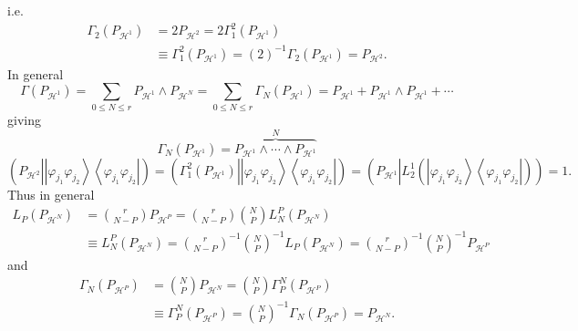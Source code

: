 \documentclass[aps,preprint]{revtex4}%
\begin{document}
i.e.%
\begin{align}
\Gamma_{2}\left(  P_{\mathcal{H}^{1}}\right)   &  =2P_{\mathcal{H}^{2}%
}=2\Gamma_{1}^{2}\left(  P_{\mathcal{H}^{1}}\right)  \nonumber\\
&  \equiv\Gamma_{1}^{2}\left(  P_{\mathcal{H}^{1}}\right)  =\left(  2\right)
^{-1}\Gamma_{2}\left(  P_{\mathcal{H}^{1}}\right)  =P_{\mathcal{H}^{2}}.
\end{align}
In general%
\begin{equation}
\Gamma\left(  P_{\mathcal{H}^{1}}\right)  =\sum_{0\leq N\leq r}P_{\mathcal{H}%
^{1}}\wedge P_{\mathcal{H}^{N}}=\sum_{0\leq N\leq r}\Gamma_{N}\left(
P_{\mathcal{H}^{1}}\right)  =P_{\mathcal{H}^{1}}+P_{\mathcal{H}^{1}}\wedge
P_{\mathcal{H}^{1}}+\cdots
\end{equation}
giving
\begin{equation}
\Gamma_{N}\left(  P_{\mathcal{H}^{1}}\right)
=\overset{N}{\overbrace{P_{\mathcal{H}^{1}}\wedge\cdots\wedge P_{\mathcal{H}%
^{1}}}}%
\end{equation}%
\begin{equation}
\left(  P_{\mathcal{H}^{2}}\left\vert \left\vert \varphi_{j_{1}}\varphi
_{j_{2}}\right\rangle \left\langle \varphi_{j_{1}}\varphi_{j_{2}}\right\vert
\right.  \right)  =\left(  \Gamma_{1}^{2}\left(  P_{\mathcal{H}^{1}}\right)
\left\vert \left\vert \varphi_{j_{1}}\varphi_{j_{2}}\right\rangle \left\langle
\varphi_{j_{1}}\varphi_{j_{2}}\right\vert \right.  \right)  =\left(
P_{\mathcal{H}^{1}}\left\vert L_{2}^{1}\left(  \left\vert \varphi_{j_{1}%
}\varphi_{j_{2}}\right\rangle \left\langle \varphi_{j_{1}}\varphi_{j_{2}%
}\right\vert \right)  \right.  \right)  =1.
\end{equation}
Thus in general
\begin{align}
L_{P}\left(  P_{\mathcal{H}^{N}}\right)   &  =\binom{r}{N-P}P_{\mathcal{H}%
^{P}}=\binom{r}{N-P}\binom{N}{P}L_{N}^{P}\left(  P_{\mathcal{H}^{N}}\right)
\nonumber\\
&  \equiv L_{N}^{P}\left(  P_{\mathcal{H}^{N}}\right)  =\binom{r}{N-P}%
^{-1}\binom{N}{P}^{-1}L_{P}\left(  P_{\mathcal{H}^{N}}\right)  =\binom{r}%
{N-P}^{-1}\binom{N}{P}^{-1}P_{\mathcal{H}^{P}}%
\end{align}
and%
\begin{align}
\Gamma_{N}\left(  P_{\mathcal{H}^{P}}\right)   &  =\binom{N}{P}P_{\mathcal{H}%
^{N}}=\binom{N}{P}\Gamma_{P}^{N}\left(  P_{\mathcal{H}^{P}}\right)
\nonumber\\
&  \equiv\Gamma_{P}^{N}\left(  P_{\mathcal{H}^{P}}\right)  =\binom{N}{P}%
^{-1}\Gamma_{N}\left(  P_{\mathcal{H}^{P}}\right)  =P_{\mathcal{H}^{N}}.
\end{align}
\end{document}
